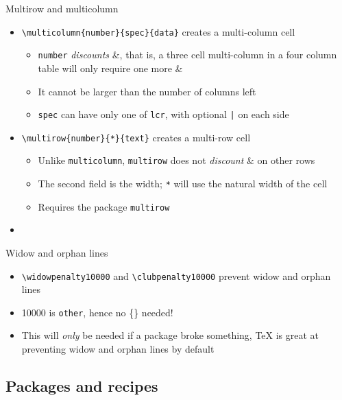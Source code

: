 \documentclass[english]{beamer}
\let\olditem\item
\renewcommand{\item}{\setlength{\itemsep}{\fill}\olditem}
\newenvironment{sitemize}{\let\item\olditem \begin{itemize}}{\vfill\end{itemize}}
\let\textttt\texttt
\renewcommand{\texttt}[1]{\colorbox{gray!10}{\textttt{#1}}}
\begin{document}
\begin{frame}[fragile]{Multirow and multicolumn}
    \begin{itemize}
        \item \verb|\multicolumn{number}{spec}{data}| creates a multi-column cell
        \begin{sitemize}
            \item \texttt{number} \emph{discounts} \&, that is, a three cell multi-column in a four column table will only require one more \&
            \item It cannot be larger than the number of columns left
            \item \texttt{spec} can have only one of \texttt{lcr}, with optional \texttt{|} on each side
        \end{sitemize}
        \item \verb|\multirow{number}{*}{text}| creates a multi-row cell
        \begin{sitemize}
            \item Unlike \texttt{multicolumn}, \texttt{multirow} does not \textit{discount} \& on other rows
            \item The second field is the width; \texttt{*} will use the natural width of the cell
            \item Requires the package \texttt{multirow}
        \end{sitemize}
        \item \hyperlink{sld_table}{}
    \end{itemize}
\end{frame}

\begin{frame}[fragile]{Widow and orphan lines}
\begin{itemize}
    \item \verb|\widowpenalty10000| and \verb|\clubpenalty10000| prevent widow and orphan lines
    \item 10000 is \texttt{other}, hence no \{\} needed!
    \item This will \textit{only} be needed if a package broke something, \TeX{} is great at preventing widow and orphan lines by default
\end{itemize}
    
\end{frame}

\subsection{Packages and recipes}
\end{document}
